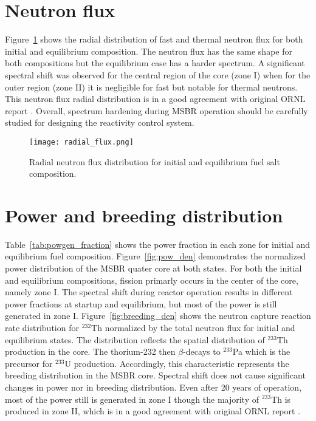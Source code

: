 \section{Neutron flux}
Figure~\ref{fig:radial_flux} shows the radial distribution of fast and thermal neutron flux for both initial and equilibrium composition. The neutron flux has the same shape for both compositions but the equilibrium case has a harder spectrum. A significant spectral shift was observed for the central region of the core (zone I) when for the outer region (zone II) it is negligible for fast but notable for thermal neutrons. This neutron flux radial distribution is in a good agreement with original ORNL report \cite{robertson_conceptual_1971}. Overall, spectrum hardening during \gls{MSBR} operation should be carefully studied for designing the reactivity control system.

\begin{figure}[htp!] %
  \centering
    \vspace{-0.3em}
  \texttt{[image: radial\_flux.png]} 
  \caption{Radial neutron flux distribution for initial and equilibrium fuel salt composition.}
    \vspace{-0.6em}
  \label{fig:radial_flux}
\end{figure}
\FloatBarrier

\section{Power and breeding distribution}
Table~\ref{tab:powgen_fraction} shows the power fraction in each zone for initial and equilibrium fuel composition. Figure~\ref{fig:pow_den} demonstrates the normalized power distribution of the \gls{MSBR} quater core at both states. For both the initial and equilibrium compositions, fission primarly occurs in the center of the core, namely zone I. The spectral shift during reactor operation results in different power fractions at startup and equilibrium, but most of the power is still generated in zone I. Figure~\ref{fig:breeding_den} shows the neutron capture reaction rate distribution for $^{232}$Th normalized by the total neutron flux for initial and equilibrium states. The distribution reflects the spatial distribution of $^{233}$Th production in the core. The thorium-232 then $\beta$-decays to $^{233}$Pa which is the precursor for $^{233}$U production. Accordingly, this characteristic represents the breeding distribution in the \gls{MSBR} core. Spectral shift does not cause significant changes in power nor in breeding distribution. Even after 20 years of operation, most of the power still is generated in zone I though the majority of $^{233}$Th is produced in zone II, which is in a good agreement with original ORNL report \cite{robertson_conceptual_1971}.

